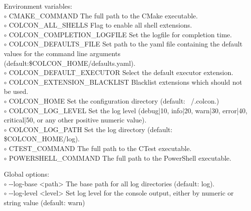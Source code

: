 \documentclass[9pt,a4paper]{article}
\newcommand{\textangles}[1]{\textless #1\textgreater}
\newcommand{\terminalfont}[1]{{\sffamily#1}}
\newcommand{\ddash}{-{}-}
\begin{document}
\begin{multicols*}{3}[]
Environment variables:\\
%
$\circ$ \terminalfont{CMAKE\_COMMAND}
The full path to the CMake executable.                                    \\
%
$\circ$ \terminalfont{COLCON\_ALL\_SHELLS}
Flag to enable all shell extensions.                                      \\
%
$\circ$ \terminalfont{COLCON\_COMPLETION\_LOGFILE}
Set the logfile for completion time.                                      \\
%
$\circ$ \terminalfont{COLCON\_DEFAULTS\_FILE}
Set path to the yaml file containing the default values for
the command line arguments (default:\$COLCON\_HOME/defaults.yaml).        \\
%
$\circ$ \terminalfont{COLCON\_DEFAULT\_EXECUTOR}
Select the default executor extension.                                    \\
%
$\circ$ \terminalfont{COLCON\_EXTENSION\_BLACKLIST}
Blacklist extensions which should not be used.                            \\
%
$\circ$ \terminalfont{COLCON\_HOME}
Set the configuration directory (default: ~/.colcon.)                     \\
%
$\circ$ \terminalfont{COLCON\_LOG\_LEVEL}
Set the log level (debug|10, info|20, warn|30, error|40, critical|50,
or any other positive numeric value).                                     \\
%
$\circ$ \terminalfont{COLCON\_LOG\_PATH}
Set the log directory (default: \$COLCON\_HOME/log).                      \\
%
$\circ$ \terminalfont{CTEST\_COMMAND}
The full path to the CTest executable.                                    \\
%
$\circ$ \terminalfont{POWERSHELL\_COMMAND}
The full path to the PowerShell executable.
%
%

\hrulefill

Global options:\\
%
$\circ$ \terminalfont{\ddash log-base \textangles{path}}
The base path for all log directories (default: log). \\
%
$\circ$ \terminalfont{\ddash log-level \textangles{level}}
Set log level for the console output, either by numeric or string value (default: warn)

\hrulefill


\end{multicols*}
\end{document}
